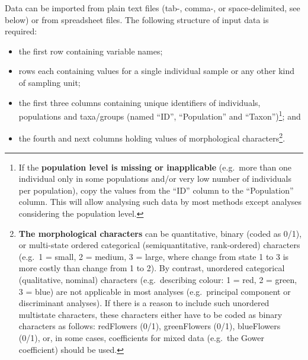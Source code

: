 \documentclass[
  11pt,
  a4paper]{article}
\providecommand{\tightlist}{%
  \setlength{\itemsep}{0pt}\setlength{\parskip}{0pt}}
\begin{document}
Data can be imported from plain text files (tab-, comma-, or
space-delimited, see below) or from spreadsheet files. The following
structure of input data is required:

\begin{itemize}
\tightlist
\item
  the first row containing variable names;
\item
  rows each containing values for a single individual sample or any
  other kind of sampling unit;
\item
  the first three columns containing unique identifiers of individuals,
  populations and taxa/groups (named ``ID'', ``Population'' and
  ``Taxon'')\footnote{If the \textbf{population level is missing or
    inapplicable} (e.g.~more than one individual only in some
    populations and/or very low number of individuals per population),
    copy the values from the ``ID'' column to the ``Population'' column.
    This will allow analysing such data by most methods except analyses
    considering the population level.}; and
\item
  the fourth and next columns holding values of morphological
  characters\footnote{\textbf{The morphological characters} can be
    quantitative, binary (coded as 0/1), or multi-state ordered
    categorical (semiquantitative, rank-ordered) characters (e.g.~1 =
    small, 2 = medium, 3 = large, where change from state 1 to 3 is more
    costly than change from 1 to 2). By contrast, unordered categorical
    (qualitative, nominal) characters (e.g.~describing colour: 1 = red,
    2 = green, 3 = blue) are not applicable in most analyses
    (e.g.~principal component or discriminant analyses). If there is a
    reason to include such unordered multistate characters, these
    characters either have to be coded as binary characters as follows:
    redFlowers (0/1), greenFlowers (0/1), blueFlowers (0/1), or, in some
    cases, coefficients for mixed data (e.g.~the Gower coefficient)
    should be used.}.
\end{itemize}
\end{document}
